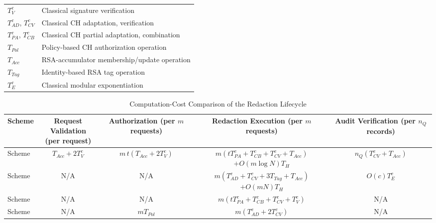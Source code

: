 \documentclass[lettersize,journal]{IEEEtran}
\begin{document}
\begin{table}[t]
\begin{tabular}{ll}
$T_V^{c}$ & Classical signature verification \\
$T_{AD}^{c}$, $T_{CV}^{c}$ & Classical CH adaptation, verification \\
$T_{PA}^{c}$, $T_{CB}^{c}$ & Classical CH partial adaptation, combination \\
$T_{Pol}$ & Policy-based CH authorization operation \\
$T_{Acc}$ & RSA-accumulator membership/update operation \\
$T_{Tag}$ & Identity-based RSA tag operation~\cite{ref13} \\
$T_E^{c}$ & Classical modular exponentiation \\
\hline
\end{tabular}
\end{table}


\begin{table}[t]
\centering
\caption{Computation-Cost Comparison of the Redaction Lifecycle}
\label{tab:comp-cost}
\footnotesize
\renewcommand{\arraystretch}{1.25}
\renewcommand{\cellset}{\renewcommand{\arraystretch}{1.45}}
\setlength{\tabcolsep}{3.2pt}
\begin{adjustbox}{max width=\textwidth}
\begin{tabular}{lcccc}
\toprule
\textbf{Scheme} &
\makecell{\textbf{Request Validation}\\\textbf{(per request)}} &
\makecell{\textbf{Authorization}\\\textbf{(per $m$ requests)}} &
\makecell{\textbf{Redaction Execution}\\\textbf{(per $m$ requests)}} &
\makecell{\textbf{Audit Verification}\\\textbf{(per $n_Q$ records)}} \\
\midrule

Scheme~\cite{ref1}
& $T_{Acc}+2T_V^{c}$
& $m\,t(T_{Acc}+2T_V^{c})$
& \makecell{$m(tT_{PA}^{c}+T_{CB}^{c}+T_{CV}^{c}+T_{Acc})$\\
$+O(m\log N)T_H$}
& $n_Q(T_{CV}^{c}+T_{Acc})$ \\

Scheme~\cite{ref13}
& N/A
& N/A
& \makecell{$m(T_{AD}^{c}+T_{CV}^{c}+3T_{Tag}+T_{Acc})$\\
$+O(mN)T_H$}
& $O(c)T_E^{c}$ \\

Scheme~\cite{ref27}
& N/A
& N/A
& $m(tT_{PA}^{c}+T_{CB}^{c}+T_{CV}^{c}+T_V^{c})$
& N/A \\

Scheme~\cite{ref34}
& N/A
& $mT_{Pol}$
& $m(T_{AD}^{c}+2T_{CV}^{c})$
& N/A \\


\end{tabular}
\end{adjustbox}
\end{table}
\end{document}
